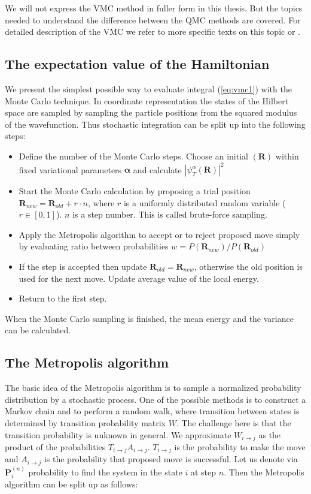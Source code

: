 \documentclass[twoside,english]{uiofysmaster}
\begin{document}
We will not express the VMC method in fuller form in this thesis. But
the topics needed to understand the difference between the QMC methods
are covered. For detailed description of the VMC we refer to more
specific texts on this topic
\cite{ToulouseIntroductionVariationalDiffusion2016} or
\cite{Hjorth-Jensenadvancedcoursecomputational2017}.


\subsection{The expectation value of the Hamiltonian}

We present the simplest possible way to evaluate integral
(\ref{eq:vmc1}) with the Monte Carlo technique. In coordinate
representation the states of the Hilbert space are sampled by sampling
the particle positions from the squared modulus of the
wavefunction. Thus stochastic integration can be split up into the
following steps:

\begin{itemize}
	\item  Define the number of the Monte Carlo steps. Choose an initial $(\boldsymbol{R})$ within fixed variational parameters $\boldsymbol{\alpha}$ and calculate $\left|\psi_T^{\alpha}(\boldsymbol{R})\right|^2$
	\item Start the Monte Carlo calculation by proposing a trial position $\boldsymbol{R}_{new}=\boldsymbol{R}_{old}+r\cdot n$, where $r$ is a uniformly distributed random variable ($r \in [0,1]$). $n$ is a step number. This is called brute-force sampling.
	\item Apply the Metropolis algorithm to accept or to reject proposed move simply by evaluating ratio between probabilities $w = P(\boldsymbol{R}_{new})/P(\boldsymbol{R}_{old})$
	\item If the step is accepted then update $\boldsymbol{R}_{old}=\boldsymbol{R}_{new}$, otherwise the old position is used for the next move. Update average value of the local energy. 
	\item Return to the first step.
\end{itemize} 
When the Monte Carlo sampling is finished, the mean energy and the
variance can be calculated.

\subsection{The Metropolis algorithm}
The basic idea of the Metropolis algorithm is to sample a normalized
probability distribution by a stochastic process. One of the possible
methods is to construct a Markov chain and to perform a random walk,
where transition between states is determined by transition
probability matrix $W$. The challenge here is that the transition
probability is unknown in general. We approximate $W_{i\rightarrow j}$
as the product of the probabilities $T_{i\rightarrow j}
A_{i\rightarrow j}$. $T_{i\rightarrow j}$ is the probability to make
the move and $A_{i\rightarrow j}$ is the probability that proposed
move is successful.  Let us denote via $\mathbf{P}_i^{(n)}$
probability to find the system in the state $i$ at step $n$. Then the
Metropolis algorithm can be split up as follows:
\end{document}
